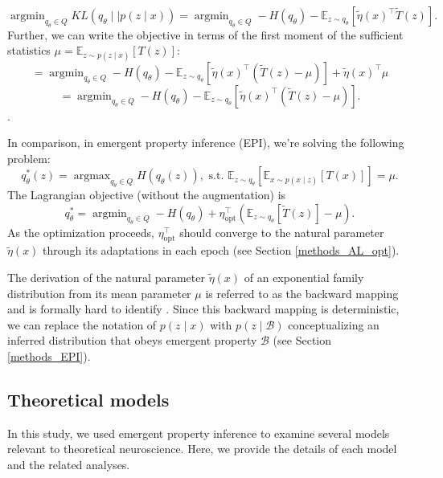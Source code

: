 \documentclass[11pt]{article}
\DeclareMathOperator*{\argmin}{argmin}
\DeclareMathOperator*{\argmax}{argmax}
\begin{document}
\begin{equation}
\argmin_{q_\theta \in Q} KL(q_\theta \mid \mid p(z \mid x)) =  \argmin_{q_\theta \in Q} -H(q_\theta) - \mathbb{E}_{z \sim q_\theta} \left[ \tilde{\eta}(x)^\top  \tilde{T}(z) \right].
\end{equation}
 Further, we can write the objective in terms of the first moment of the sufficient statistics $\mu = \mathbb{E}_{z \sim p(z \mid x)}\left[T(z) \right]$:
 \begin{equation}
=  \argmin_{q_\theta \in Q} -H(q_\theta) - \mathbb{E}_{z \sim q_\theta} \left[ \tilde{\eta}(x)^\top \left(  \tilde{T}(z) -\mu \right) \right] + \tilde{\eta}(x)^\top \mu
 \end{equation}
  \begin{equation}
=  \argmin_{q_\theta \in Q} -H(q_\theta) - \mathbb{E}_{z \sim q_\theta} \left[ \tilde{\eta}(x)^\top \left(  \tilde{T}(z) -\mu \right) \right].
 \end{equation}.

In comparison, in emergent property inference (EPI), we're solving the following problem:
\begin{equation}
q_\theta^*(z) = \argmax_{q_\theta \in Q} H(q_\theta(z)),   \text{  s.t.  } \mathbb{E}_{z \sim q_\theta}\left[ \mathbb{E}_{x\sim p(x \mid z)}\left[T(x)\right] \right] = \mu.
\end{equation}
The Lagrangian objective (without the augmentation) is
\begin{equation}
q_\theta^* = \argmin_{q_\theta \in Q} - H(q_\theta) + \eta_{\text{opt}}^\top \left(\mathbb{E}_{z \sim q_\theta} \left[\tilde{T}(z) \right] - \mu \right).
\end{equation}
As the optimization proceeds, $\eta_{\text{opt}}^\top$ should converge to the natural parameter $\tilde{\eta}(x)$ through its adaptations in each epoch (see Section \ref{methods_AL_opt}). 

The derivation of the natural parameter $\tilde{\eta}(x)$ of an exponential family distribution from its mean parameter $\mu$ is referred to as the backward mapping and is formally hard to identify \cite{wainwright2008graphical}.  Since this backward mapping is deterministic,  we can replace the notation of $p(z \mid x)$ with $p(z \mid \mathcal{B})$ conceptualizing an inferred distribution that obeys emergent property $\mathcal{B}$ (see Section \ref{methods_EPI}). 

\subsection{Theoretical models}\label{methods_theoretical_models}
In this study, we used emergent property inference to examine several models relevant to theoretical neuroscience.  Here, we provide the details of each model  and the related analyses.
\end{document}
